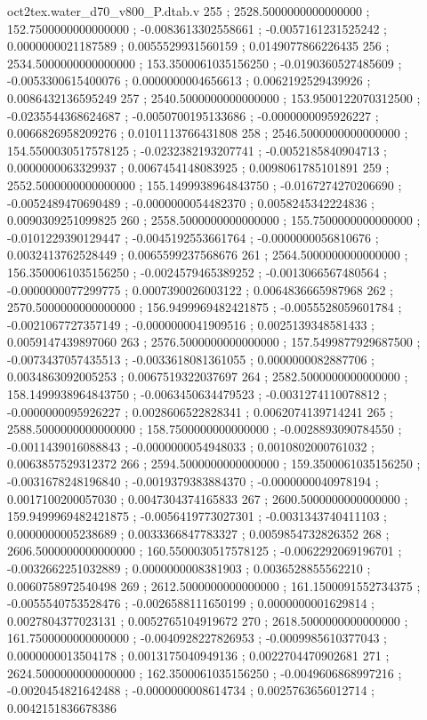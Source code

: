\begin{filecontents}[overwrite]{oct2tex.water_d70_v800_P.dtab.v}
255 ; 2528.5000000000000000 ; 152.7500000000000000 ; -0.0083613302558661 ; -0.0057161231525242 ; 0.0000000021187589 ; 0.0055529931560159 ; 0.0149077866226435
256 ; 2534.5000000000000000 ; 153.3500061035156250 ; -0.0190360527485609 ; -0.0053300615400076 ; 0.0000000004656613 ; 0.0062192529439926 ; 0.0086432136595249
257 ; 2540.5000000000000000 ; 153.9500122070312500 ; -0.0235544368624687 ; -0.0050700195133686 ; -0.0000000095926227 ; 0.0066826958209276 ; 0.0101113766431808
258 ; 2546.5000000000000000 ; 154.5500030517578125 ; -0.0232382193207741 ; -0.0052185840904713 ; 0.0000000063329937 ; 0.0067454148083925 ; 0.0098061785101891
259 ; 2552.5000000000000000 ; 155.1499938964843750 ; -0.0167274270206690 ; -0.0052489470690489 ; -0.0000000054482370 ; 0.0058245342224836 ; 0.0090309251099825
260 ; 2558.5000000000000000 ; 155.7500000000000000 ; -0.0101229390129447 ; -0.0045192553661764 ; -0.0000000056810676 ; 0.0032413762528449 ; 0.0065599237568676
261 ; 2564.5000000000000000 ; 156.3500061035156250 ; -0.0024579465389252 ; -0.0013066567480564 ; -0.0000000077299775 ; 0.0007390026003122 ; 0.0064836665987968
262 ; 2570.5000000000000000 ; 156.9499969482421875 ; -0.0055528059601784 ; -0.0021067727357149 ; -0.0000000041909516 ; 0.0025139348581433 ; 0.0059147439897060
263 ; 2576.5000000000000000 ; 157.5499877929687500 ; -0.0073437057435513 ; -0.0033618081361055 ; 0.0000000082887706 ; 0.0034863092005253 ; 0.0067519322037697
264 ; 2582.5000000000000000 ; 158.1499938964843750 ; -0.0063450634479523 ; -0.0031274110078812 ; -0.0000000095926227 ; 0.0028606522828341 ; 0.0062074139714241
265 ; 2588.5000000000000000 ; 158.7500000000000000 ; -0.0028893090784550 ; -0.0011439016088843 ; -0.0000000054948033 ; 0.0010802000761032 ; 0.0063857529312372
266 ; 2594.5000000000000000 ; 159.3500061035156250 ; -0.0031678248196840 ; -0.0019379383884370 ; -0.0000000040978194 ; 0.0017100200057030 ; 0.0047304374165833
267 ; 2600.5000000000000000 ; 159.9499969482421875 ; -0.0056419773027301 ; -0.0031343740411103 ; 0.0000000005238689 ; 0.0033366847783327 ; 0.0059854732826352
268 ; 2606.5000000000000000 ; 160.5500030517578125 ; -0.0062292069196701 ; -0.0032662251032889 ; 0.0000000008381903 ; 0.0036528855562210 ; 0.0060758972540498
269 ; 2612.5000000000000000 ; 161.1500091552734375 ; -0.0055540753528476 ; -0.0026588111650199 ; 0.0000000001629814 ; 0.0027804377023131 ; 0.0052765104919672
270 ; 2618.5000000000000000 ; 161.7500000000000000 ; -0.0040928227826953 ; -0.0009985610377043 ; 0.0000000013504178 ; 0.0013175040949136 ; 0.0022704470902681
271 ; 2624.5000000000000000 ; 162.3500061035156250 ; -0.0049606868997216 ; -0.0020454821642488 ; -0.0000000008614734 ; 0.0025763656012714 ; 0.0042151836678386

\end{filecontents}
